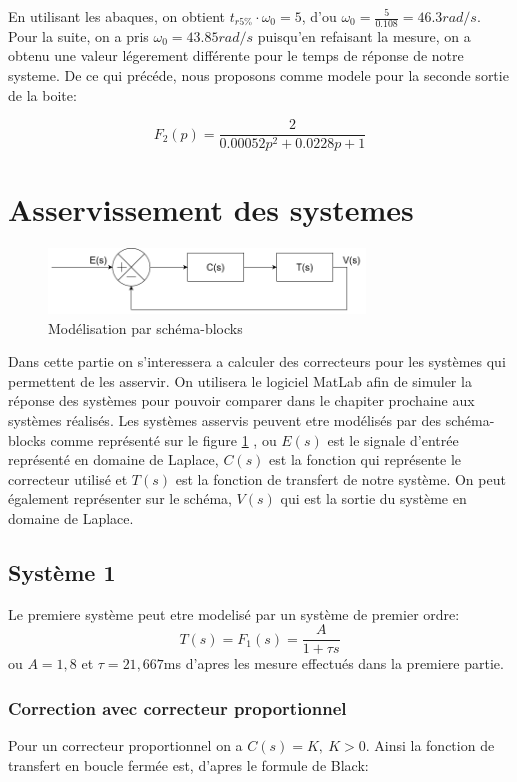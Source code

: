 \documentclass[12pt, a4paper]{report}
\begin{document}
En utilisant les abaques, on obtient $t_{r5\%} \cdot \omega_0 = 5$, d'ou 
$\omega_0 = \frac{5}{0.108} = 46.3 rad/s$. Pour la suite, on a pris $\omega_0 = 43.85 rad/s$ puisqu'en refaisant la mesure, on a obtenu une valeur légerement différente pour
le temps de réponse de notre systeme. De ce qui précéde, nous proposons comme modele pour la seconde sortie de la boite:

\[
    F_2(p) = \frac{2}{0.00052p^2 + 0.0228p + 1}
\]

\section{Asservissement des systemes}

\begin{figure}[h]
    \centering
    \includegraphics[width=0.75\textwidth]{schemablock2.png}
    \caption{Modélisation par schéma-blocks}
    \label{fig:schemablock}
\end{figure}

Dans cette partie on s'interessera a calculer des correcteurs
pour les systèmes qui permettent de les asservir. On utilisera le logiciel 
MatLab afin de simuler la réponse des systèmes pour pouvoir comparer dans le chapiter 
prochaine aux systèmes réalisés. Les systèmes asservis peuvent etre modélisés
par des schéma-blocks comme représenté sur le figure \ref{fig:schemablock}
, ou $E(s)$ est le signale
d'entrée représenté en domaine de Laplace, $C(s)$ est 
la fonction qui représente le correcteur utilisé et $T(s)$ est la fonction de transfert
de notre système. On peut également représenter sur le schéma, $V(s)$ qui est la sortie
du système en domaine de Laplace.
 



\subsection{Système 1}
Le premiere système peut etre modelisé par un système de premier ordre:
$$
    T(s) = F_1(s) = \frac{A}{1 + \tau s}
$$
ou $A = 1,8$ et $\tau = 21,667$ms d'apres les mesure effectués dans la premiere partie.

\subsubsection{Correction avec correcteur proportionnel}
Pour un correcteur proportionnel on a $C(s) = K, \ K > 0$. Ainsi la fonction de transfert 
en boucle fermée est, d'apres le formule de Black:
\end{document}
